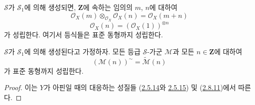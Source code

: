 \begin{corollary}[3.2.7]
\label{II.3.2.7-ko}
$\mathcal{S}$가 $\mathcal{S}_1$에 의해 생성되면, $\mathbf{Z}$에 속하는
임의의 $m$, $n$에 대하여
\[
\label{II.3.2.7.1-ko}
  \mathcal{O}_X(m)\otimes_{\mathcal{O}_X}\mathcal{O}_X(n)
  =\mathcal{O}_X(m+n)
\tag{3.2.7.1}
\]
\[
\label{II.3.2.7.2-ko}
  \mathcal{O}_X(n)=(\mathcal{O}_X(1))^{\otimes n}
\tag{3.2.7.2}
\]
가 성립한다. 여기서 등식들은 표준 동형까지 성립한다.
\end{corollary}


\begin{corollary}[3.2.8]
\label{II.3.2.8-ko}
$\mathcal{S}$가 $\mathcal{S}_1$에 의해 생성된다고 가정하자. 모든 등급
$\mathcal{S}$-가군 $\mathcal{M}$과 모든 $n\in\mathbf{Z}$에 대하여
\[
\label{II.3.2.8.1-ko}
  (\mathcal{M}(n))^{\sim}=\widetilde{\mathcal{M}}(n)
\tag{3.2.8.1}
\]
가 표준 동형까지 성립한다.
\end{corollary}

\begin{proof}
이는 $Y$가 아핀일 때의 대응하는 성질들
(\hyperref[II.2.5.14-ko]{2.5.14}와
\hyperref[II.2.5.15-ko]{2.5.15}) 및
(\hyperref[II.2.8.11-ko]{2.8.11})에서 따른다.
\end{proof}

